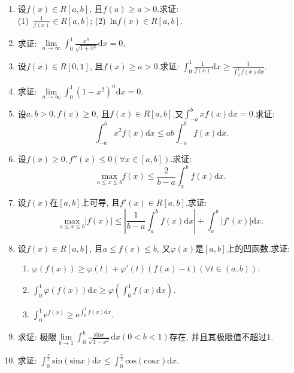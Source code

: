 \begin{enumerate}
	\item 设$f(x)\in R[a,b]$, 且$f(a)\ge a>0.$求证:\\
	(1)\  $\frac{1}{f(x)}\in R[a,b]$; \qquad \qquad \qquad (2)\ $\mathrm{ln}f(x)\in R[a,b]$.
	\item 求证: $\displaystyle{\lim\limits_{n\rightarrow \infty}\int_{0}^{1}\frac{x^n}{\sqrt{1+x^4}}\mathrm{d}x=0}$.
	\item 设$f(x)\in R[0,1]$, 且$f(x)\ge a>0$.求证: $\displaystyle{\int_{0}^{1}\frac{1}{f(x)}\mathrm{d}x}\ge \frac{1}{\displaystyle{\int_{0}^{1}f(x)\mathrm{d}x}}$.
	\item 求证: $\displaystyle{\lim\limits_{n\rightarrow \infty}\int_{0}^{1}(1-x^2)^n\mathrm{d}x=0}$.
	\item 设$a,b>0,f(x)\ge 0$, 且$f(x)\in R[a,b]$,又$\displaystyle{\int_{-a}^{b}xf(x)\mathrm{d}x}=0$.求证:
	$$\displaystyle{\int_{-a}^{b}x^2f(x)\mathrm{d}x\le ab\int_{-a}^{b}f(x)\mathrm{d}x}.$$
	\item 设$f(x)\ge 0,f''(x)\le 0(\forall x\in [a,b])$.求证:
	$$\underset{a\le x \le b}{\mathrm{max}}f(x)\le \displaystyle{\frac{2}{b-a}\int_{a}^{b}f(x)\mathrm{d}x}.$$
	\item 设$f(x)$在$[a,b]$上可导, 且$f'(x)\in R[a,b]$.求证:
	$$\underset{a\le x\le b}{\mathrm{max}}|f(x)|\le \displaystyle{|\frac{1}{b-a}\int_{a}^{b}f(x)\mathrm{d}x|+\int_{a}^{b}|f'(x)|\mathrm{d}x}.$$
	\item 设$f(x)\in R[a,b]$, 且$a\le f(x)\le b$, 又$\varphi(x)$是$[a,b]$上的凹函数.求证:
	\begin{enumerate}
		\item $\varphi(f(x))\ge \varphi(t)+\varphi'(t)(f(x)-t)(\forall t\in(a,b))$;
		\item $\displaystyle{\int_{0}^{1}\varphi(f(x))\mathrm{d}x\ge \varphi(\int_{0}^{1}f(x)\mathrm{d}x)}$.
		\item $\displaystyle {\int_{0}^{1}\mathrm{e}^{f(x)}\ge \mathrm{e}^{\int_{0}^{1}f(x)\mathrm{d}x}}$.
		
	\end{enumerate}
\item 求证: 极限$\displaystyle{\lim\limits_{b\rightarrow 1}\int_{0}^{b}\frac{\mathrm{sin}x}{\sqrt{1-x^2}}\mathrm{d}x}(0<b<1)$存在, 并且其极限值不超过1.
\item 求证: $\displaystyle{\int_{0}^{\frac{\pi}{2}}\mathrm{sin}(\mathrm{sin}x)\mathrm{d}x\le \int_{0}^{\frac{\pi}{2}}\mathrm{cos}(\mathrm{cos}x)}\mathrm{d}x$.
\end{enumerate}

